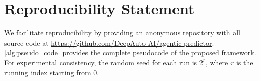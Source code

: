 \documentclass{article} %
\begin{document}
\section*{Reproducibility Statement}
We facilitate reproducibility by providing an anonymous repository with all source code at \url{https://github.com/DeepAuto-AI/agentic-predictor}. \autoref{alg:pseudo_code} provides the complete pseudocode of the proposed framework. For experimental consistency, the random seed for each run is $2^r$, where $r$ is the running index starting from 0.




\appendix

\end{document}
